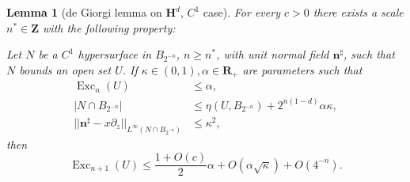 \documentclass[reqno,12pt,letterpaper]{amsart}
\newcommand{\ZZ}{\mathbf{Z}}
\newcommand{\RR}{\mathbf{R}}
\newcommand{\Hyp}{\mathbf H}
\DeclareMathOperator{\Exc}{Exc}
\newcommand{\normal}{\mathbf n}
\newtheorem{lemma}[theorem]{Lemma}
\theoremstyle{definition}
\numberwithin{equation}{section}
\begin{document}
\begin{lemma}[de Giorgi lemma on $\Hyp^d$, $C^1$ case]\label{DGL2}
For every $c > 0$ there exists a scale $n^* \in \ZZ$ with the following property:

Let $N$ be a $C^1$ hypersurface in $B_{2^{-n}}$, $n \geq n^*$, with unit normal field $\normal^\sharp$, such that $N$ bounds an open set $U$.
If $\kappa \in (0, 1), \alpha \in \RR_+$ are parameters such that
\begin{align}
\Exc_n(U) &\leq \alpha, \label{DGL2 1}\\
|N \cap B_{2^{-n}}| &\leq \eta(U, B_{2^{-n}}) + 2^{n(1 - d)}\alpha \kappa, \label{DGL2 2}\\
||\normal^\sharp - x\partial_z||_{L^\infty(N \cap B_{2^{-n}})} &\leq \kappa^2, \label{DGL2 3}
\end{align}
then
$$\Exc_{n + 1}(U) \leq \frac{1 + O(c)}{2} \alpha + O(\alpha \sqrt \kappa) + O(4^{-n}).$$
\end{lemma}
\end{document}
